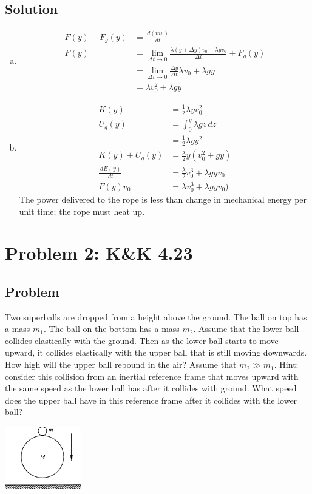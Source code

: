 \documentclass[solutions]{esg8012pset}
\renewcommand{\d}{\,d}
\begin{document}
\subsection*{Solution}
  \begin{enumerate}[a)]
    \item
  \begin{align*}
    F(y) - F_g(y) & = \frac{\d (m v)}{\d t} \\
    F(y) & = \lim_{\Delta t \rightarrow 0} \frac{\lambda (y+\Delta y) v_0 - \lambda y v_0}{\Delta t} + F_g(y) \\
    & = \lim_{\Delta t \rightarrow 0} \frac{\Delta y}{\Delta t} \lambda v_0 + \lambda g y \\
    & = \lambda v_0^2 + \lambda g y
  \end{align*}
    \item \begin{align*}
    K(y) & = \frac{1}{2}\lambda y v_0^2 \\
    U_g(y) & = \int_{0}^y \lambda g z \d z \\
          & = \frac{1}{2}\lambda g y^2 \\
    K(y) + U_g(y) & = \frac{\lambda}{2} y(v_0^2 + g y) \\
    \frac{\d E(y)}{\d t} & = \frac{\lambda}{2} v_0^3 + \lambda g y v_0 \\
    F(y)v_0 & = \lambda v_0^3 + \lambda g y v_0)
    \end{align*} The power delivered to the rope is less than change in mechanical energy per unit time; the rope must heat up.  %
  \end{enumerate}
\section*{Problem 2: K\&K 4.23}
\subsection*{Problem}
  Two superballs are dropped from a height above the ground. The ball on top has a mass $m_1$. The ball on the bottom has a mass $m_2$. Assume that the lower ball collides elastically with the ground. Then as the lower ball starts to move upward, it collides elastically with the upper ball that is still moving downwards. How high will the upper ball rebound in the air? Assume that $m_2 \gg m_1$. Hint: consider this collision from an inertial reference frame that moves upward with the same speed as the lower ball has after it collides with ground. What speed does the upper ball have in this reference frame after it collides with the lower ball?
  \begin{center}\includegraphics[width=0.25\textwidth]{ps07_2}\end{center}
\end{document}
